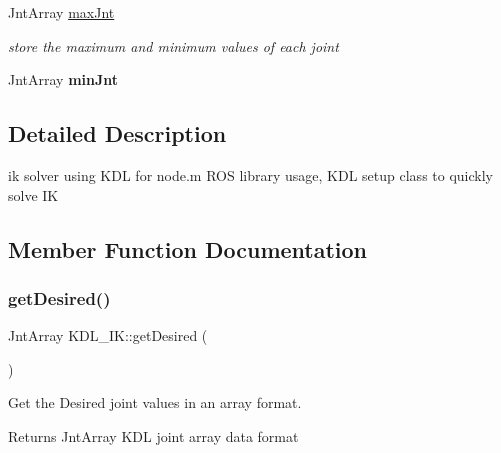 \begin{DoxyCompactItemize}
\mbox{\label{classKDL__IK_ace94ad54266c4b7099659dfabbb2a342}} 
Jnt\+Array \hyperlink{classKDL__IK_ace94ad54266c4b7099659dfabbb2a342}{max\+Jnt}
\begin{DoxyCompactList}\small\item\em store the maximum and minimum values of each joint \end{DoxyCompactList}\item 
\mbox{\label{classKDL__IK_a3d9d9c11cf2847ae6a85e8241c7885e8}} 
Jnt\+Array {\bfseries min\+Jnt}
\end{DoxyCompactItemize}


\subsection{Detailed Description}
ik solver using K\+DL for node.\+m R\+OS library usage, K\+DL setup class to quickly solve IK 

\subsection{Member Function Documentation}
\mbox{\label{classKDL__IK_a1e6c6aeb2f702fe462f593946c120f32}} 
\subsubsection{\texorpdfstring{get\+Desired()}{getDesired()}}
{\footnotesize\ttfamily Jnt\+Array K\+D\+L\+\_\+\+I\+K\+::get\+Desired (\begin{DoxyParamCaption}{ }\end{DoxyParamCaption})\hspace{0.3cm}{\ttfamily [inline]}}



Get the Desired joint values in an array format. 

\begin{DoxyReturn}{Returns}
Jnt\+Array K\+DL joint array data format 
\end{DoxyReturn}
\mbox{\label{classKDL__IK_ac5840ffc7f30fd303ab5454d02456c54}} 

